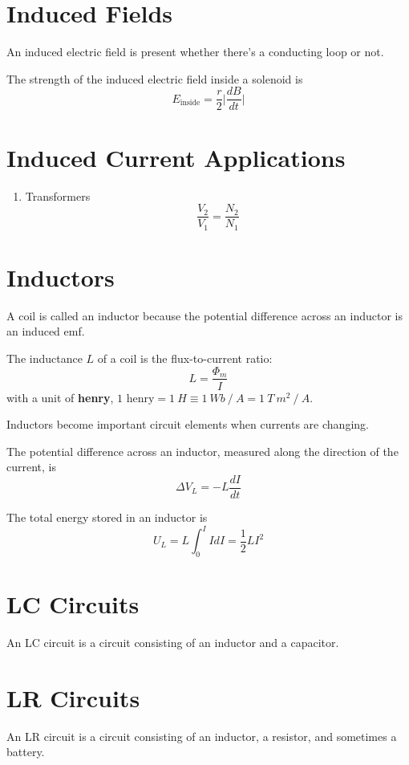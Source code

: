 \documentclass{article}
\begin{document}
\section*{Induced Fields}
An induced electric field is present whether there's a conducting loop or not.

\vspace*{0.5em}
The strength of the induced electric field inside a solenoid is
\[E_\text{inside}=\frac{r}{2}\Big|\frac{dB}{dt}\Big|\]

\section*{Induced Current Applications}
\begin{enumerate}
    \item Transformers
    \[\frac{V_2}{V_1}=\frac{N_2}{N_1}\]
\end{enumerate}
\section*{Inductors}
A coil is called an inductor because the potential difference across an inductor is an induced emf.

The inductance $L$ of a coil is the flux-to-current ratio:
\[L=\frac{\Phi_m}{I}\] with a unit of \textbf{henry},
$1 \text{ henry} = 1\: H \equiv 1\: Wb\: /\: A = 1\: T\: m^2\: /\: A$.

\vspace{1em}
Inductors become important circuit elements when currents are changing.

\vspace{1em}
The potential difference across an inductor, measured along the direction of the current, is
\[\Delta V_L = -L\frac{dI}{dt}\]

The total energy stored in an inductor is
\[U_L = L\int_0^I I dI = \frac{1}{2}LI^2\]

\section*{LC Circuits}
An LC circuit is a circuit consisting of an inductor and a capacitor.

\section*{LR Circuits}
An LR circuit is a circuit consisting of an inductor, a resistor, and sometimes a battery.
\end{document}
